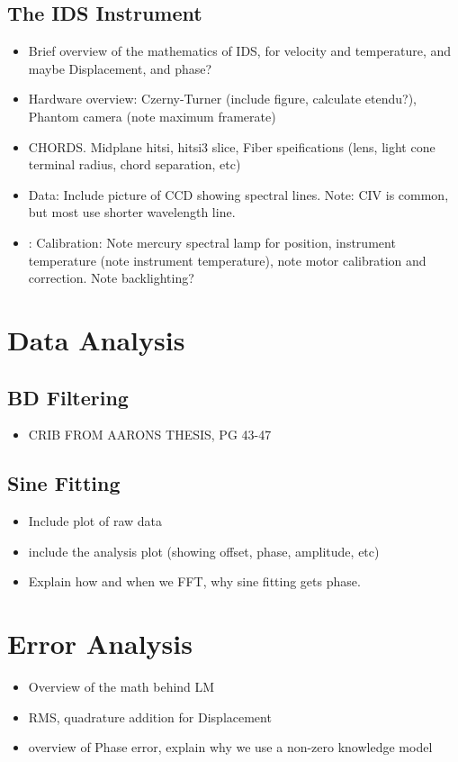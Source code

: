 \documentclass[10pt]{article}
\begin{document}
\subsection{The IDS Instrument}
\begin{itemize}
	\item Brief overview of the mathematics of IDS, for velocity and temperature, and maybe Displacement, and phase?
	\item Hardware overview: Czerny-Turner (include figure, calculate etendu?), Phantom camera (note maximum framerate)
	\item CHORDS. Midplane hitsi, hitsi3 slice, Fiber speifications (lens, light cone terminal radius, chord separation, etc)
	\item Data: Include picture of CCD showing spectral lines. Note: CIV is common, but most use shorter wavelength line.
	\item: Calibration: Note mercury spectral lamp for position, instrument temperature (note instrument temperature), note motor calibration and correction. Note backlighting?
\end{itemize}
\section{Data Analysis}
\subsection{BD Filtering}
\begin{itemize}
	\item CRIB FROM AARONS THESIS, PG 43-47
\end{itemize}
\subsection{Sine Fitting}
\begin{itemize}
	\item Include plot of raw data
	\item include the analysis plot (showing offset, phase, amplitude, etc)
	\item Explain how and when we FFT, why sine fitting gets phase.
\end{itemize}
\section{Error Analysis}
\begin{itemize}
	\item Overview of the math behind LM
	\item RMS, quadrature addition for Displacement
	\item overview of Phase error, explain why we use a non-zero knowledge model
\end{itemize}
\end{document}
